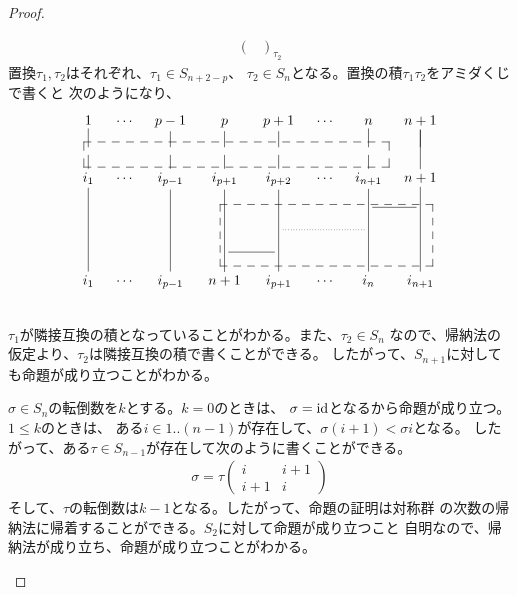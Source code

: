 {\begin{proof}
\begin{description}
\begin{equation*}
\begin{split}
{\begin{pmatrix}
			\end{pmatrix}}_{\tau_2}
		\end{split}\end{equation*}
		置換$\tau_1,\tau_2$はそれぞれ、$\tau_1\in S_{n+2-p}$、
		$\tau_2\in S_n$となる。置換の積$\tau_1\tau_2$をアミダくじで書くと
		次のようになり、
		\begin{equation*}\xymatrix@R=1em@C=1em{
			1 \ar@{-}[d] & \cdots & p - 1 \ar@{-}[d] & p \ar@{-}[d] 
				& p + 1 \ar@{-}[d] & \cdots & n \ar@{-}[d] 
				& n + 1 \ar@{-}[d] \ar@{-}[dd] \\
		 \ar@{-}[d]	& & \ar@{-}[d] & \ar@{-}[d] & \ar@{-}[d] 
			 & & \ar@{-}[d] & \\
			i_1 \ar@{-}[dddd] & \cdots & i_{p - 1} \ar@{-}[dddd]
				& i_{p + 1} \ar@{-}[dddd] & i_{p + 2} \ar@{-}[dddd] & \cdots
				& i_{n + 1} \ar@{-}[dddd] & n + 1 \ar@{-}[dddd] \\
			& & & & & & \ar@{-}[r] & \\
			& & & & \ar@{.}[rr] & & & \\
			& & & \ar@{-}[r] & & & & \\
			i_1 & \cdots & i_{p - 1} & n + 1 & i_{p + 1} & \cdots 
				& i_n & i_{n + 1} \\
			\save "2,1"."2,7"*++[F--]\frm{} \restore
			\save "4,4"."6,8"*+[F--]\frm{} \restore
		}\end{equation*}
		$\tau_1$が隣接互換の積となっていることがわかる。また、$\tau_2\in S_n$
		なので、帰納法の仮定より、$\tau_2$は隣接互換の積で書くことができる。
		したがって、$S_{n+1}$に対しても命題が成り立つことがわかる。
		\item[転倒数] $\sigma\in S_n$の転倒数を$k$とする。$k=0$のときは、
		$\sigma={\operatorname{id}}$となるから命題が成り立つ。$1\le k$のときは、
		ある$i\in 1..(n-1)$が存在して、$\sigma(i+1) < \sigma i$となる。
		したがって、ある$\tau\in S_{n-1}$が存在して次のように書くことができる。
		\begin{equation*}\begin{split}
			\sigma = \tau \begin{pmatrix}
				i & i + 1 \\ i + 1 & i
			\end{pmatrix}
		\end{split}\end{equation*}
		そして、$\tau$の転倒数は$k-1$となる。したがって、命題の証明は対称群
		の次数の帰納法に帰着することができる。$S_2$に対して命題が成り立つこと
		自明なので、帰納法が成り立ち、命題が成り立つことがわかる。
	\end{description} %
	\end{proof}

}
